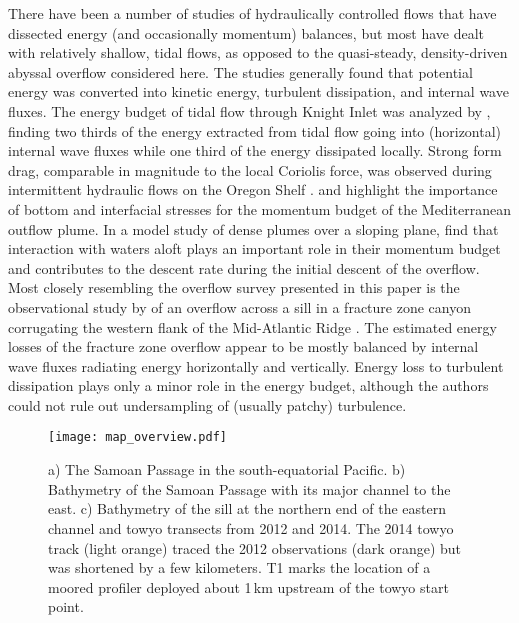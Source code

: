 \documentclass{ametsocV6.1}
\begin{document}
There have been a number of studies of hydraulically controlled flows that have dissected energy (and occasionally momentum) balances, but most have dealt with relatively shallow, tidal flows, as opposed to the quasi-steady, density-driven abyssal overflow considered here.
The studies generally found that potential energy was converted into kinetic energy, turbulent dissipation, and internal wave fluxes.
The energy budget of tidal flow through Knight Inlet \citep{farmersmith80a, farmerarmi99, farmerarmi99a} was analyzed by \citet{klymakgregg04}, finding two thirds of the energy extracted from tidal flow going into (horizontal) internal wave fluxes while one third of the energy dissipated locally.
Strong form drag, comparable in magnitude to the local Coriolis force, was observed during intermittent hydraulic flows on the Oregon Shelf \citep{moumnash00, nashmoum01}.
\citet{johnsonetal94b} and \citet{johnsonetal94a} highlight the importance of bottom and interfacial stresses for the momentum budget of the Mediterranean outflow plume.
In a model study of dense plumes over a sloping plane, \citet{kidaetal09} find that interaction with waters aloft plays an important role in their momentum budget and contributes to the descent rate during the initial descent of the overflow.
Most closely resembling the overflow survey presented in this paper is the observational study by \citet{clementetal17} of an overflow across a sill in a fracture zone canyon corrugating the western flank of the Mid-Atlantic Ridge \citep[see also][]{thurnherretal05}.
The estimated energy losses of the fracture zone overflow appear to be mostly balanced by internal wave fluxes radiating energy horizontally and vertically.
Energy loss to turbulent dissipation plays only a minor role in the energy budget, although the authors could not rule out undersampling of (usually patchy) turbulence.

\begin{figure*}
\centerline{\texttt{[image: map\_overview.pdf]}}
\caption{
a) The Samoan Passage in the south-equatorial Pacific. b) Bathymetry of the Samoan Passage with its major channel to the east. c) Bathymetry of the sill at the northern end of the eastern channel and towyo transects from 2012 and 2014. The 2014 towyo track (light orange) traced the 2012 observations (dark orange) but was shortened by a few kilometers. T1 marks the location of a moored profiler deployed about 1\,km upstream of the towyo start point.
}
\label{fig:OverviewMap}
\end{figure*}
\end{document}
